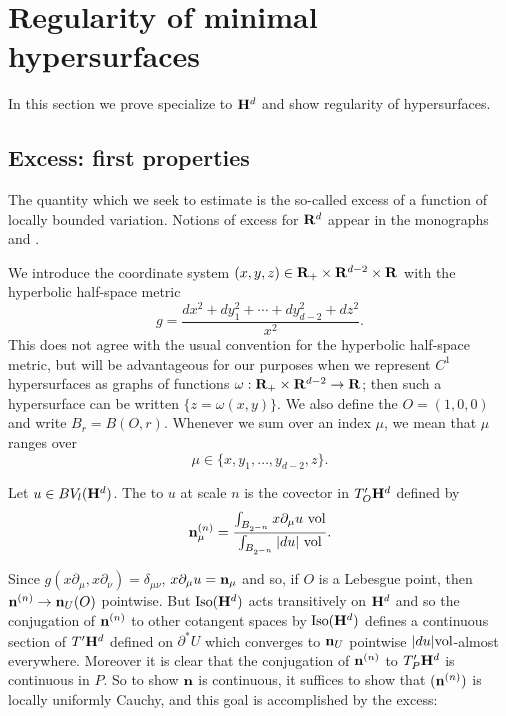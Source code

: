 \section{Regularity of minimal hypersurfaces}\label{DeGiorgiSection}
In this section we prove specialize to $\mathbf H^d$ and show regularity of hypersurfaces.

\subsection{Excess: first properties}
The quantity which we seek to estimate is the so-called excess of a function of locally bounded variation.
Notions of excess for $\mathbf{R}^d$ appear in the monographs \cite[\S5.3.1]{federer2014geometric} and \cite[Chapter 6]{Giusti77}.

We introduce the coordinate system $(x, y, z) \in \mathbf{R}_+ \times \mathbf{R}^{d - 2} \times \mathbf{R}$ with the hyperbolic half-space metric 
\begin{equation}\label{hyperbolic metric}
g = \frac{dx^2 + dy_1^2 + \cdots + dy_{d - 2}^2 + dz^2}{x^2}.
\end{equation}
This does not agree with the usual convention for the hyperbolic half-space metric, but will be advantageous for our purposes when we represent $C^1$ hypersurfaces as graphs of functions $\omega: \mathbf{R}_+ \times \mathbf{R}^{d - 2} \to \mathbf{R}$; then such a hypersurface can be written $\{z = \omega(x, y)\}$.
We also define the  $O = (1, 0, 0)$ and write $B_r = B(O, r)$.
Whenever we sum over an index $\mu$, we mean that $\mu$ ranges over 
$$\mu \in \{x, y_1, \dots, y_{d - 2}, z\}.$$

\begin{definition}
Let $u \in BV_l(\mathbf H^d)$. The  to $u$ at scale $n$ is the covector in $T_O' \mathbf H^d$ defined by
$$\mathbf n^{(n)}_\mu = \frac{\int_{B_{2^{-n}}} x \partial_\mu u ~\mathrm{vol}}{\int_{B_{2^{-n}}} |du| ~\mathrm{vol}}.$$
\end{definition}

Since $g(x\partial_\mu, x\partial_\nu) = \delta_{\mu\nu}$, $x\partial_\mu u = \mathbf n_\mu$ and so, if $O$ is a Lebesgue point, then $\mathbf n^{(n)} \to \mathbf n_U(O)$ pointwise.
But $\operatorname{Iso}(\mathbf H^d)$ acts transitively on $\mathbf H^d$ and so the conjugation of $\mathbf n^{(n)}$ to other cotangent spaces by $\operatorname{Iso}(\mathbf H^d)$ defines a continuous section of $T'\mathbf H^d$ defined on $\partial^* U$ which converges to $\mathbf n_U$ pointwise $|du|\mathrm{vol}$-almost everywhere.
Moreover it is clear that the conjugation of $\mathbf n^{(n)}$ to $T'_P\mathbf H^d$ is continuous in $P$.
So to show $\mathbf n$ is continuous, it suffices to show that $(\mathbf n^{(n)})$ is locally uniformly Cauchy, and this goal is accomplished by the excess:

